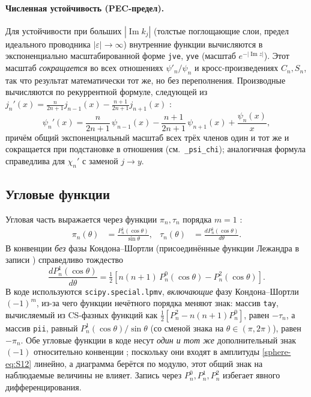 \documentclass[11pt,a4paper]{article}
\begin{document}
\paragraph{Численная устойчивость (PEC-предел).} Для устойчивости при больших $|\operatorname{Im} k_j|$ (толстые поглощающие слои, предел идеального проводника $|\varepsilon|\to\infty$) внутренние функции вычисляются в экспоненциально масштабированной форме \texttt{jve}, \texttt{yve} (масштаб $e^{-|\operatorname{Im} z|}$). Этот масштаб \emph{сокращается} во всех отношениях $\psi'_n/\psi_n$ и кросс-произведениях $C_n,S_n$, так что результат математически тот же, но без переполнения. Производные вычисляются по рекуррентной формуле, следующей из $j_n'(x)=\tfrac{n}{2n+1}j_{n-1}(x)-\tfrac{n+1}{2n+1}j_{n+1}(x)$ \cite{dlmf}:
\begin{equation}
\psi_n'(x)=\frac{n}{2n+1}\,\psi_{n-1}(x)-\frac{n+1}{2n+1}\,\psi_{n+1}(x)+\frac{\psi_n(x)}{x},
\label{sphere-eq:psi-deriv}
\end{equation}
причём общий экспоненциальный масштаб всех трёх членов один и тот же и сокращается при подстановке в отношения (см.\ \texttt{\_psi\_chi}); аналогичная формула справедлива для $\chi_n'$ с заменой $j\to y$.

\subsection{Угловые функции}

Угловая часть выражается через функции $\pi_n,\tau_n$ порядка $m=1$ \cite{bohren1983}:
\begin{align}
\pi_n(\theta) &= \frac{P_n^{1}(\cos\theta)}{\sin\theta}, &
\tau_n(\theta) &= \frac{d P_n^{1}(\cos\theta)}{d\theta}.
\label{sphere-eq:pi-tau}
\end{align}
В конвенции \emph{без} фазы Кондона--Шортли (присоединённые функции Лежандра в записи \cite{bohren1983}) справедливо тождество \cite{dlmf}
\begin{equation}
\frac{d P_n^{1}(\cos\theta)}{d\theta}=\tfrac12\!\left[n(n+1)\,P_n^{0}(\cos\theta)-P_n^{2}(\cos\theta)\right].
\label{sphere-eq:tau-id}
\end{equation}
В коде используются \texttt{scipy.special.lpmv}, \emph{включающие} фазу Кондона--Шортли $(-1)^m$, из-за чего функции нечётного порядка меняют знак: массив \texttt{tay}, вычисляемый из CS-фазных функций как $\tfrac12\!\left[P_n^{2}-n(n+1)P_n^{0}\right]$, равен $-\tau_n$, а массив \texttt{pii}, равный $P_n^1(\cos\theta)/\sin\theta$ (со сменой знака на $\theta\in(\pi,2\pi)$), равен $-\pi_n$. Обе угловые функции в коде несут \emph{один и тот же} дополнительный знак $(-1)$ относительно конвенции \cite{bohren1983}; поскольку они входят в амплитуды \eqref{sphere-eq:S12} линейно, а диаграмма берётся по модулю, этот общий знак на наблюдаемые величины не влияет. Запись через $P_n^{0},P_n^{1},P_n^{2}$ избегает явного дифференцирования.
\end{document}

